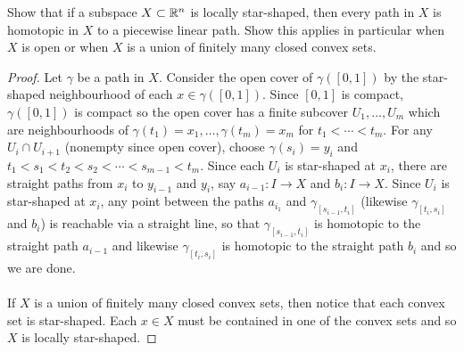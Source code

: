 \documentclass[a4paper]{article}
\begin{document}
\begin{ex}{}{} Show that if a subspace $X\subset\mathbb{R}^n$ is locally star-shaped, then every path in $X$ is homotopic in $X$ to a piecewise linear path. Show this applies in particular when $X$ is open or when $X$ is a union of finitely many closed convex sets. \tcbline
\begin{proof}
Let $\gamma$ be a path in $X$. Consider the open cover of $\gamma([0,1])$ by the star-shaped neighbourhood of each $x\in\gamma([0,1])$. Since $[0,1]$ is compact, $\gamma([0,1])$ is compact so the open cover has a finite subcover $U_1,\dots,U_m$ which are neighbourhoods of $\gamma(t_1)=x_1,\dots,\gamma(t_m)=x_m$ for $t_1<\cdots<t_m$. For any $U_i\cap U_{i+1}$ (nonempty since open cover), choose $\gamma(s_i)=y_i$ and $t_1<s_1<t_2<s_2<\cdots<s_{m-1}<t_m$. Since each $U_i$ is star-shaped at $x_i$, there are straight paths from $x_i$ to $y_{i-1}$ and $y_i$, say $a_{i-1}:I\to X$ and $b_i:I\to X$. Since $U_i$ is star-shaped at $x_i$, any point between the paths $a_{i_1}$ and $\gamma_{[s_{i-1},t_i]}$ (likewise $\gamma_{[t_i,s_i]}$ and $b_i$) is reachable via a straight line, so that $\gamma_{[s_{i-1},t_i]}$ is homotopic to the straight path $a_{i-1}$ and likewise $\gamma_{[t_i,s_i]}$ is homotopic to the straight path $b_i$ and so we are done. \\~\\

If $X$ is a union of finitely many closed convex sets, then notice that each convex set is star-shaped. Each $x\in X$ must be contained in one of the convex sets and so $X$ is locally star-shaped. 
\end{proof}
\end{ex}
\end{document}
